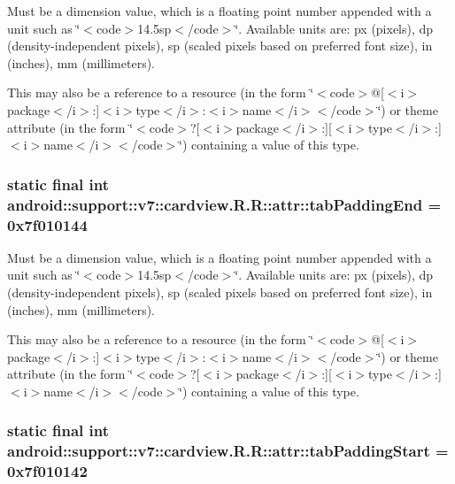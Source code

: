 Must be a dimension value, which is a floating point number appended with a unit such as \char`\"{}$<$code$>$14.5sp$<$/code$>$\char`\"{}. Available units are: px (pixels), dp (density-independent pixels), sp (scaled pixels based on preferred font size), in (inches), mm (millimeters). 

This may also be a reference to a resource (in the form \char`\"{}$<$code$>$@\mbox{[}$<$i$>$package$<$/i$>$:\mbox{]}$<$i$>$type$<$/i$>$:$<$i$>$name$<$/i$>$$<$/code$>$\char`\"{}) or theme attribute (in the form \char`\"{}$<$code$>$?\mbox{[}$<$i$>$package$<$/i$>$:\mbox{]}\mbox{[}$<$i$>$type$<$/i$>$:\mbox{]}$<$i$>$name$<$/i$>$$<$/code$>$\char`\"{}) containing a value of this type. \hypertarget{classandroid_1_1support_1_1v7_1_1cardview_1_1_r_1_1attr_7ca488e9d7ffd031a7805582f761c4d9}{
\subsubsection[{tabPaddingEnd}]{\setlength{\rightskip}{0pt plus 5cm}static final int android::support::v7::cardview.R.R::attr::tabPaddingEnd = 0x7f010144}}
\label{classandroid_1_1support_1_1v7_1_1cardview_1_1_r_1_1attr_7ca488e9d7ffd031a7805582f761c4d9}


Must be a dimension value, which is a floating point number appended with a unit such as \char`\"{}$<$code$>$14.5sp$<$/code$>$\char`\"{}. Available units are: px (pixels), dp (density-independent pixels), sp (scaled pixels based on preferred font size), in (inches), mm (millimeters). 

This may also be a reference to a resource (in the form \char`\"{}$<$code$>$@\mbox{[}$<$i$>$package$<$/i$>$:\mbox{]}$<$i$>$type$<$/i$>$:$<$i$>$name$<$/i$>$$<$/code$>$\char`\"{}) or theme attribute (in the form \char`\"{}$<$code$>$?\mbox{[}$<$i$>$package$<$/i$>$:\mbox{]}\mbox{[}$<$i$>$type$<$/i$>$:\mbox{]}$<$i$>$name$<$/i$>$$<$/code$>$\char`\"{}) containing a value of this type. \hypertarget{classandroid_1_1support_1_1v7_1_1cardview_1_1_r_1_1attr_54b83e3a031622ce10b54a318192bcbf}{
\subsubsection[{tabPaddingStart}]{\setlength{\rightskip}{0pt plus 5cm}static final int android::support::v7::cardview.R.R::attr::tabPaddingStart = 0x7f010142}}
\label{classandroid_1_1support_1_1v7_1_1cardview_1_1_r_1_1attr_54b83e3a031622ce10b54a318192bcbf}


